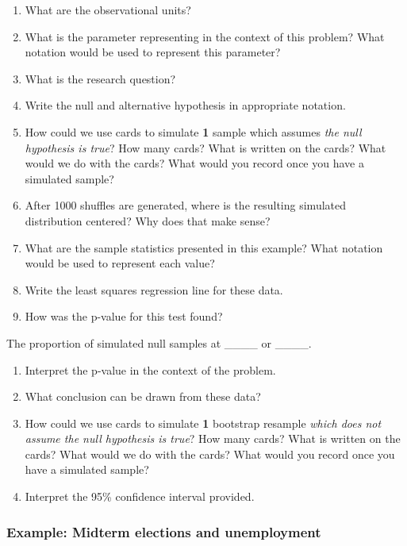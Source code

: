 \documentclass[
]{report}
\newcommand{\rgs}{\vspace{12pt}} %
\begin{document}
\begin{enumerate}
\def\labelenumi{\arabic{enumi}.}
\item
  What are the observational units?
  \rgs
\item
  What is the parameter representing in the context of this problem? What notation would be used to represent this parameter?
  \rgs
  \rgs
\item
  What is the research question?
  \rgs
\item
  Write the null and alternative hypothesis in appropriate notation.
  \rgs
\item
  How could we use cards to simulate \textbf{1} sample which assumes \emph{the null hypothesis is true}? How many cards? What is written on the cards? What would we do with the cards? What would you record once you have a simulated sample?
  \rgs
  \rgs
\item
  After 1000 shuffles are generated, where is the resulting simulated distribution centered? Why does that make sense?
  \rgs
  \rgs
\item
  What are the sample statistics presented in this example? What notation would be used to represent each value?
  \rgs
\item
  Write the least squares regression line for these data.
  \rgs
\item
  How was the p-value for this test found?
\end{enumerate}

The proportion of simulated null samples at \_\_\_\_ or \_\_\_\_.
\rgs

\begin{enumerate}
\def\labelenumi{\arabic{enumi}.}
\setcounter{enumi}{9}
\item
  Interpret the p-value in the context of the problem.
  \rgs
  \rgs
\item
  What conclusion can be drawn from these data?\\
  \rgs
\item
  How could we use cards to simulate \textbf{1} bootstrap resample \emph{which does not assume the null hypothesis is true}? How many cards? What is written on the cards? What would we do with the cards? What would you record once you have a simulated sample?
  \rgs
  \rgs
\item
  Interpret the 95\% confidence interval provided.
  \rgs
  \rgs
\end{enumerate}

\hypertarget{example-midterm-elections-and-unemployment}{%
\subsubsection*{Example: Midterm elections and unemployment}\label{example-midterm-elections-and-unemployment}}
\end{document}
